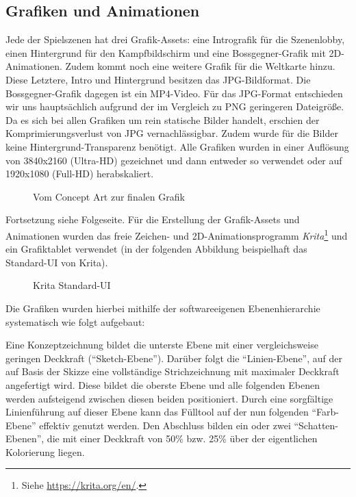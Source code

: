 

\subsection{Grafiken und Animationen}
Jede der Spielszenen hat drei Grafik-Assets: eine Intrografik für die Szenenlobby, einen Hintergrund für den Kampfbildschirm und eine Bossgegner-Grafik mit 2D-Animationen. Zudem kommt noch eine weitere Grafik für die Weltkarte hinzu. Diese Letztere, Intro und Hintergrund besitzen das JPG-Bildformat. Die Bossgegner-Grafik dagegen ist ein MP4-Video.
Für das JPG-Format entschieden wir uns hauptsächlich aufgrund der im Vergleich zu PNG geringeren Dateigröße. Da es sich bei allen Grafiken um rein statische Bilder handelt, erschien der Komprimierungsverlust von JPG vernachlässigbar. Zudem wurde für die Bilder keine Hintergrund-Transparenz benötigt.
Alle Grafiken wurden in einer Auflösung von 3840x2160 (Ultra-HD) gezeichnet und dann entweder so verwendet oder auf 1920x1080 (Full-HD) herabskaliert.

\begin{figure}[H]
    \centering
     \label{fig:mine_exterior_concept}
     \caption{Vom Concept Art zur finalen Grafik}
  \end{figure}

Fortsetzung siehe Folgeseite.
  \newpage
Für die Erstellung der Grafik-Assets und Animationen wurden das freie Zeichen- und 2D-Animationsprogramm \textit{Krita}\footnote{Siehe \url{https://krita.org/en/}.} und ein Grafiktablet verwendet (in der folgenden Abbildung beispielhaft das Standard-UI von Krita).   

\begin{figure}[H]
    \centering
    \caption{Krita Standard-UI}
    \label{fig:krita_ui_example}
\end{figure}

Die Grafiken wurden hierbei mithilfe der softwareeigenen Ebenenhierarchie systematisch wie folgt aufgebaut: 

Eine Konzeptzeichnung bildet die unterste Ebene mit einer vergleichsweise geringen Deckkraft (\enquote{Sketch-Ebene}). Darüber folgt die \enquote{Linien-Ebene}, auf der auf Basis der Skizze eine vollständige Strichzeichnung mit maximaler Deckkraft angefertigt wird. Diese bildet die oberste Ebene und alle folgenden Ebenen werden aufsteigend zwischen diesen beiden positioniert. Durch eine sorgfältige Linienführung auf dieser Ebene kann das Fülltool auf der nun folgenden \enquote{Farb-Ebene} effektiv genutzt werden. Den Abschluss bilden ein oder zwei \enquote{Schatten-Ebenen}, die mit einer Deckkraft von 50\% bzw. 25\% über der eigentlichen Kolorierung liegen. 

